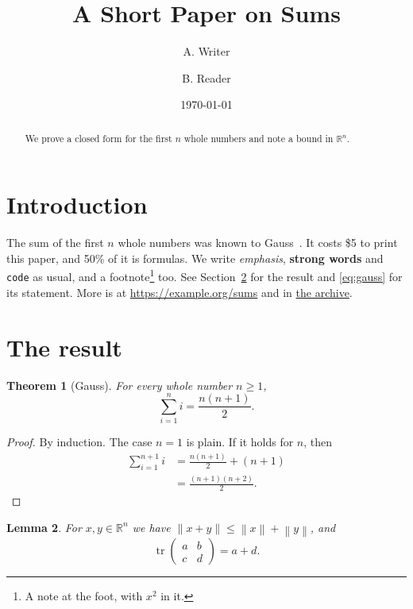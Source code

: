 \documentclass[11pt]{article}
\title{A Short Paper on Sums}
\author{A. Writer \and B. Reader}
\date{\today}
\newcommand{\R}{\mathbb{R}}
\newcommand{\norm}[1]{\left\lVert #1 \right\rVert}
\DeclareMathOperator{\tr}{tr}
\newtheorem{theorem}{Theorem}
\newtheorem{lemma}[theorem]{Lemma}
\begin{document}
\maketitle

\begin{abstract}
We prove a closed form for the first $n$ whole numbers and note a bound in $\R^n$.
\end{abstract}

\section{Introduction}\label{sec:intro}

The sum of the first $n$ whole numbers was known to Gauss~\cite{gauss}.
It costs \$5 to print this paper, and 50\% of it is formulas.
We write \emph{emphasis}, \textbf{strong words} and \texttt{code} as usual,
and a footnote\footnote{A note at the foot, with $x^2$ in it.} too.
See Section~\ref{sec:result} for the result and \eqref{eq:gauss} for its statement.
More is at \url{https://example.org/sums} and in \href{https://example.org}{the archive}.

\section{The result}\label{sec:result}

\begin{theorem}[Gauss]\label{thm:gauss}
For every whole number $n \ge 1$,
\begin{equation}\label{eq:gauss}
  \sum_{i=1}^{n} i = \frac{n(n+1)}{2}.
\end{equation}
\end{theorem}

\begin{proof}
By induction. The case $n = 1$ is plain. If it holds for $n$, then
\begin{align}
  \sum_{i=1}^{n+1} i &= \frac{n(n+1)}{2} + (n+1) \\
                     &= \frac{(n+1)(n+2)}{2}. \nonumber
\end{align}
\end{proof}

\begin{lemma}\label{lem:norm}
For $x, y \in \R^n$ we have $\norm{x + y} \le \norm{x} + \norm{y}$, and
\[
  \tr\begin{pmatrix} a & b \\ c & d \end{pmatrix} = a + d .
\]
\end{lemma}
\end{document}

